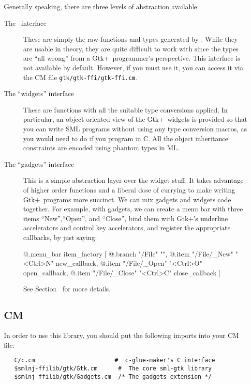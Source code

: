 \documentclass{article}
\newcommand{\gtk}{\mbox{\sf Gtk+}}
\begin{document}
Generally speaking, there are three levels of abstraction available:
\begin{description}
   \item[The \mlnlffigen\ interface]  
These are simply the raw functions and types generated by \mlnlffigen.
While they are usable in theory, they are quite difficult to work with
since the types are ``all wrong'' from a \gtk\ programmer's perspective.
This interface is not available by default.  However, if you must use it,
you can access it via the CM file \verb|gtk/gtk-ffi/gtk-ffi.cm|.
   \item[The ``widgets'' interface] 
These are functions with all the suitable type conversions applied.
In particular, an object oriented view of the \gtk\ widgets is provided
so that you can write SML programs without using 
any type conversion macros, as you would need to do if you program in C.
All the object inheritance constraints are encoded using phantom types in ML.
   \item[The ``gadgets'' interface] This is a simple 
abstraction layer over the widget stuff. 
It takes advantage of higher order functions and a liberal dose 
of currying to make writing \gtk\ programs more succinct.
We can mix gadgets and widgets code together.  For example,
with gadgets, we can create a menu bar with three 
items ``New'',``Open'', and ``Close'', bind them with 
\gtk's underline accelerators and control key accelerators, 
and register the appropriate callbacks, by just saying:
\begin{smldisp}
   @.menu_bar item_factory
   [ @.branch "/File" "",
       @.item "/File/_New" "<Ctrl>N" new_callback,
       @.item "/File/_Open" "<Ctrl>O" open_callback,
       @.item "/File/_Close" "<Ctrl>C" close_callback
   ]
\end{smldisp}
See Section~ for more details.
\end{description}

\subsection{CM}

In order to use this library, you should put the following imports
into your CM file:

\begin{verbatim}
   C/c.cm                       #  c-glue-maker's C interface 
   $smlnj-ffilib/gtk/Gtk.cm      #  The core sml-gtk library 
   $smlnj-ffilib/gtk/Gadgets.cm  /* The gadgets extension */ 
\end{verbatim}
\end{document}
